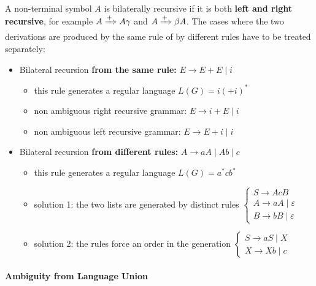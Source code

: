 \documentclass[english]{article}
\begin{document}
A non-terminal symbol \(A\) is bilaterally recursive if it is both \textbf{left and right recursive}, for example \(A \xRightarrow{+} A \gamma\) and \(A \xRightarrow{+} \beta A\).
The cases where the two derivations are produced by the same rule of by different rules have to be treated separately:

\begin{itemize}
  \item Bilateral recursion \textbf{from the same rule:} \(E \rightarrow E + E \mid i\)
        \begin{itemize}
          \item this rule generates a regular language \(L(G) = i (+i)^\ast\)
          \item non ambiguous right recursive grammar: \(E \rightarrow i + E \mid i\)
          \item non ambiguous left recursive grammar: \(E \rightarrow E + i \mid i\)
        \end{itemize}
  \item Bilateral recursion \textbf{from different rules:} \(A \rightarrow aA \mid Ab \mid c\)
        \begin{itemize}
          \item this rule generates a regular language \(L(G) = a^\ast c b^\ast\)
          \item solution 1: the two lists are generated by distinct rules
                \(\begin{cases}
                  S  \rightarrow AcB                 \\
                  A  \rightarrow aA \mid \varepsilon \\
                  B  \rightarrow bB \mid \varepsilon
                \end{cases}\)
          \item solution 2: the rules force an order in the generation
                \(\begin{cases}
                  S \rightarrow aS \mid X \\
                  X \rightarrow Xb \mid c
                \end{cases}\)
        \end{itemize}
\end{itemize}

\paragraph{Ambiguity from Language Union}
\end{document}
